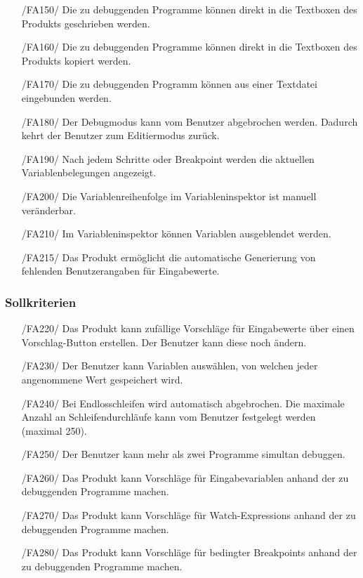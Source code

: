 \documentclass[parskip=full]{scrartcl}
\begin{document}
\begin{itemize}
		\item[/FA150/] Die zu debuggenden Programme können direkt in die Textboxen des Produkts  geschrieben werden.
		\item[/FA160/] Die zu debuggenden Programme können direkt in die Textboxen des Produkts kopiert werden.
		\item[/FA170/] Die zu debuggenden Programm können aus einer Textdatei eingebunden werden.
		\item[/FA180/] Der \gls{Debugmodus} kann vom Benutzer abgebrochen werden. Dadurch kehrt der Benutzer zum \gls{Editiermodus} zurück.
		\item[/FA190/] Nach jedem \gls{Schritt}e oder \gls{Breakpoint} werden die aktuellen Variablenbelegungen angezeigt.
		\item[/FA200/] Die Variablenreihenfolge im Variableninspektor ist manuell veränderbar.
		\item[/FA210/] Im Variableninspektor können Variablen ausgeblendet werden.
		\item[/FA215/] Das Produkt ermöglicht die automatische Generierung von fehlenden Benutzerangaben für Eingabewerte.
		\end{itemize}

 		\subsubsection{Sollkriterien}
		\begin{itemize}
		\item[/FA220/] Das Produkt kann zufällige Vorschläge für Eingabewerte über einen Vorschlag-Button erstellen. Der Benutzer kann diese noch ändern.
		\item[/FA230/] Der Benutzer kann Variablen auswählen, von welchen jeder angenommene Wert gespeichert wird.
		\item[/FA240/] Bei Endlosschleifen wird automatisch abgebrochen. Die maximale Anzahl an Schleifendurchläufe kann vom Benutzer festgelegt werden (maximal 250).
		\item[/FA250/] Der Benutzer kann mehr als zwei Programme simultan debuggen.
		\item[/FA260/] Das Produkt kann Vorschläge für Eingabevariablen anhand der zu debuggenden Programme machen.
		\item[/FA270/] Das Produkt kann Vorschläge für \glspl{Watch-Expression} anhand der zu debuggenden Programme machen.
		\item[/FA280/] Das Produkt kann Vorschläge für \glspl{bedingter Breakpoint} anhand der zu debuggenden Programme machen.
		\end{itemize}
\end{document}
